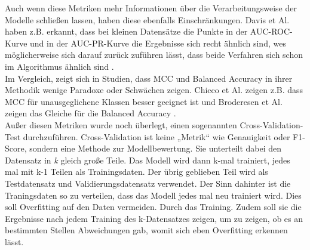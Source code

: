 \documentclass[a4paper,12pt]{article}
\begin{document}
	Auch wenn diese Metriken  mehr Informationen über die Verarbeitungsweise der Modelle schließen lassen, haben diese ebenfalls Einschränkungen. Davis et Al. haben z.B. erkannt, dass bei kleinen Datensätze die Punkte in der AUC-ROC-Kurve und in der AUC-PR-Kurve die Ergebnisse sich recht ähnlich sind, wes möglicherweise sich darauf zurück zuführen lässt, dass beide Verfahren sich schon im Algorithmus ähnlich sind \cite{davis2006relationship}.
	\\[0.5em]
	Im Vergleich, zeigt sich in Studien, dass MCC und Balanced Accuracy in ihrer Methodik wenige Paradoxe oder Schwächen zeigen. Chicco et Al. zeigen z.B. dass MCC für unausgeglichene Klassen besser geeignet ist und Broderesen et Al. zeigen das Gleiche für die Balanced Accuracy \cite{chicco2020advantages, brodersen2010balanced}.
	\\[0.5em]
	Außer diesen Metriken wurde noch überlegt, einen sogenannten Cross-Validation-Test durchzuführen. Cross-Validation ist keine „Metrik“ wie Genauigkeit oder F1-Score, sondern eine Methode zur Modellbewertung. Sie unterteilt dabei den Datensatz in \textit{k} gleich große Teile.  Das Modell wird dann k-mal trainiert, jedes mal mit k-1 Teilen als Trainingsdaten. Der übrig geblieben Teil wird als Testdatensatz und Validierungsdatensatz verwendet. Der Sinn dahinter ist die Traningsdaten so zu verteilen, dass das Modell jedes mal neu trainiert wird. Dies soll Overfitting auf den Daten vermeiden. Durch das Training. Zudem soll sie die Ergebnisse nach jedem Training des k-Datensatzes zeigen, um zu zeigen, ob es an bestimmten Stellen Abweichungen gab, womit sich eben Overfitting erkennen lässt.
	
\end{document}
